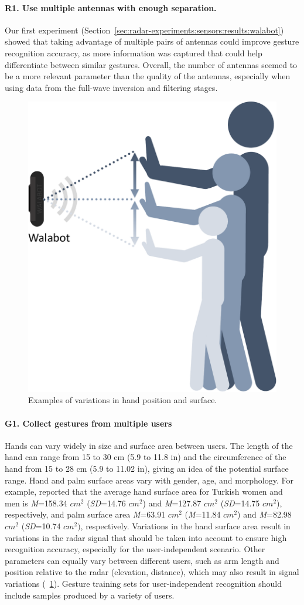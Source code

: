 \paragraph{R1. Use multiple antennas with enough separation.}
Our first experiment (Section~\ref{sec:radar-experiments:sensors:results:walabot}) showed that taking advantage of multiple pairs of antennas could improve gesture recognition accuracy, as more information was captured that could help differentiate between similar gestures. Overall, the number of antennas seemed to be a more relevant parameter than the quality of the antennas, especially when using data from the full-wave inversion and filtering stages. 

\begin{figure}
    \centering
    \includegraphics[width=.4\linewidth]{Figures/RadarExperiments/Discussion/pipeline-limitations-size.pdf}
    \caption{Examples of variations in hand position and surface.}
    \label{fig:radar-experiments:discussion:elevation}
\end{figure}

\paragraph{G1. Collect gestures from multiple users}
Hands can vary widely in size and surface area between users. The length of the hand can range from 15 to 30 cm (5.9 to 11.8 in) and the circumference of the hand from 15 to 28 cm (5.9 to 11.02 in), giving an idea of the potential surface range. Hand and palm surface areas vary with gender, age, and morphology. For example, \cite{Goker:2017} reported that the average hand surface area for Turkish women and men is \textit{M}{=}158.34 $cm^2$ (\textit{SD}{=}14.76 $cm^2$) and \textit{M}{=}127.87 $cm^2$ (\textit{SD}{=}14.75 $cm^2$), respectively, and palm surface area \textit{M}{=}63.91 $cm^2$ (\textit{M}{=}11.84 $cm^2$) and \textit{M}{=}82.98 $cm^2$ (\textit{SD}{=}10.74 $cm^2)$, respectively. 
Variations in the hand surface area result in variations in the radar signal that should be taken into account to ensure high recognition accuracy, especially for the user-independent scenario. Other parameters can equally vary between different users, such as arm length and position relative to the radar (\eg elevation, distance), which may also result in signal variations (\fig~\ref{fig:radar-experiments:discussion:elevation}). Gesture training sets for user-independent recognition should include samples produced by a variety of users.

